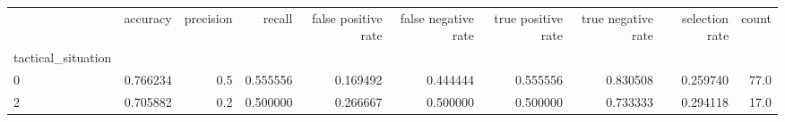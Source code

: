 \begin{tabular}{lrrrrrrrrr}
\toprule
{} &  accuracy &  precision &    recall &  false positive rate &  false negative rate &  true positive rate &  true negative rate &  selection rate &  count \\
tactical\_situation &           &            &           &                      &                      &                     &                     &                 &        \\
\midrule
0                  &  0.766234 &        0.5 &  0.555556 &             0.169492 &             0.444444 &            0.555556 &            0.830508 &        0.259740 &   77.0 \\
2                  &  0.705882 &        0.2 &  0.500000 &             0.266667 &             0.500000 &            0.500000 &            0.733333 &        0.294118 &   17.0 \\
\bottomrule
\end{tabular}
